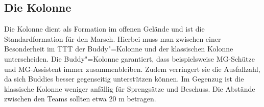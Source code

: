 \subsection{Die Kolonne}\label{Kolonne}
Die Kolonne dient als Formation im offenen Gelände und ist die Standardformation für den Marsch. Hierbei muss man zwischen einer Besonderheit im \ac{TTT} der Buddy"=Kolonne und der klassischen Kolonne unterscheiden. Die Buddy"=Kolonne garantiert, dass beispielsweise MG-Schütze und MG-Assistent immer zusammenbleiben. Zudem verringert sie die Ausfallzahl, da sich Buddies besser gegenseitig unterstützen können. Im Gegenzug ist die klassische Kolonne weniger anfällig für Sprengsätze und Beschuss. Die Abstände zwischen den Teams sollten etwa 20 m betragen.
\begin{figure}[h]
	\centering
	\label{fig:Kolonne}
\end{figure}

